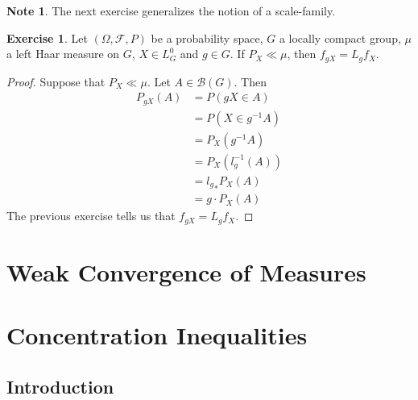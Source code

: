 \documentclass[12pt]{amsart}
\theoremstyle{definition}
\newtheorem{note}[definition]{Note}
\newtheorem{ex}[definition]{Exercise}
\newcommand{\Om}{\Omega}
\newcommand{\MB}{\mathcal{B}}
\newcommand{\MF}{\mathcal{F}}
\begin{document}
	\begin{note}
	The next exercise generalizes the notion of a scale-family.
	\end{note}
	
	\begin{ex}
	Let $(\Om, \MF, P)$ be a probability space, $G$ a locally compact group, $\mu$ a left Haar measure on $G$, $X \in L^0_G$ and $g \in G$. If $P_X \ll \mu$, then $f_{gX} = L_g f_X$.
	\end{ex}
	
	\begin{proof}
	Suppose that $P_X \ll \mu$. Let $A \in \MB(G)$. Then 
	\begin{align*}
	P_{gX}(A) 
	&= P(gX \in A) \\
	&= P(X \in g^{-1}A) \\
	&= P_X(g^{-1}A) \\
	&= P_X(l_g^{-1}(A)) \\
	&= {l_g}_*P_X(A) \\
	&= g \cdot P_X(A)
	\end{align*}
	The previous exercise tells us that $f_{gX} = L_g f_X$.
	\end{proof}
	
	
	
	
	
	
	
	
	
	
	
	
	
	
	\newpage
	\section{Weak Convergence of Measures}
	
	
	
	
	
	
	
	
	
	
	
	
	
	
	
	
	
	
	
	
	
	
	
	
	
	
	
	\newpage
	\section{Concentration Inequalities}
	
	\subsection{Introduction}
	
\end{document}
